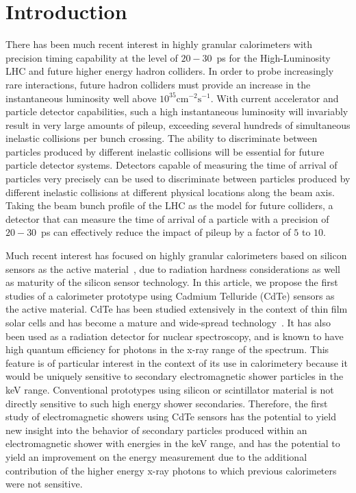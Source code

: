 \section{Introduction} 

There has been much recent interest in highly granular calorimeters with 
precision timing capability at the level of $20-30$~ps for the High-Luminosity
LHC and future higher energy hadron colliders. In order to probe increasingly
rare interactions, future hadron colliders must provide an increase in the
instantaneous luminosity well above $10^{35}\mathrm{cm}^{-2}\mathrm{s}^{-1}$.
With current accelerator and particle detector capabilities, such a high 
instantaneous luminosity will invariably result in very large amounts
of pileup, exceeding several hundreds of simultaneous inelastic collisions per
bunch crossing. The ability to discriminate between particles produced by 
different inelastic collisions will be essential for future particle detector
systems. Detectors capable of measuring the time of arrival of particles
very precisely can be used to discriminate between particles produced by
different inelastic collisions at different physical locations along the beam
axis. Taking the beam bunch profile of the LHC as the model for future
colliders, a detector that can measure the time of arrival of a particle
with a precision of $20-30$~ps can effectively reduce the impact of
pileup by a factor of $5$ to $10$. 

Much recent interest has focused on highly granular calorimeters based on 
silicon sensors as the active material~\cite{Adloff:2009,Butler:2020886}, due to
radiation hardness considerations as well as maturity of the silicon sensor
technology. In this article, we propose the first studies of a 
calorimeter prototype using Cadmium Telluride (CdTe) sensors as the 
active material. CdTe has been studied extensively in the context
of thin film solar cells and has become a mature and wide-spread
technology~\cite{CdTeSolar}. It has also been used as a radiation
detector for nuclear spectroscopy, and is known to have high
quantum efficiency for photons in the x-ray range of the spectrum.
This feature is of particular interest in the context of its use
in calorimetery because it would be uniquely sensitive to secondary
electromagnetic shower particles in the keV range. Conventional prototypes 
using silicon or scintillator material is not directly sensitive to such high 
energy shower secondaries. Therefore, the first study of electromagnetic
showers using CdTe sensors has the potential to yield new insight
into the behavior of secondary particles produced within an 
electromagnetic shower with energies in the keV range, and has the potential
to yield an improvement on the energy measurement due to
the additional contribution of the higher energy x-ray photons to which previous
calorimeters were not sensitive.

